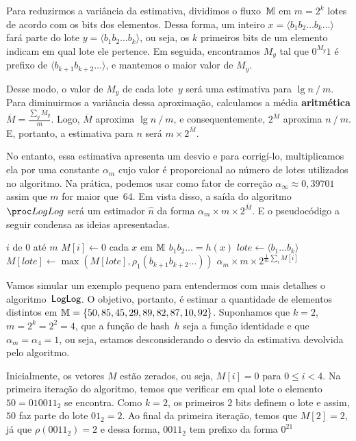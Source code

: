 Para reduzirmos a variância da estimativa, dividimos o fluxo~$\mathbb{M}$ em $m = 2^{k}$ lotes de acordo com os bits dos 
elementos. Dessa forma, um inteiro $x = \langle b_1 b_2 {\dots} b_k {\dots} \rangle$ fará parte do lote 
$y = \langle b_1 b_2 {\dots} b_k \rangle$, ou seja, os $k$ primeiros bits de um elemento indicam em qual lote ele 
pertence. Em seguida, encontramos $M_y$ tal que $0^{M_y}1$ é prefixo de $\langle b_{k+1} b_{k+2} {\dots} \rangle$, e 
mantemos o maior valor de $M_y$.

Desse modo, o valor de $M_y$ de cada lote~$y$ será uma estimativa para $\lg n \mathbin{/} m$. Para diminuirmos a 
variância dessa aproximação, calculamos a média \textbf{aritmética} $\overline{M} = \frac{\sum_y M_y}{m}$. Logo, 
$\overline{M}$ aproxima $\lg n \mathbin{/} m$, e consequentemente, $2^{\overline{M}}$ aproxima $n \mathbin{/} m$. E, 
portanto, a estimativa para $n$ será $m \times 2^{\overline{M}}$.

No entanto, essa estimativa apresenta um desvio e para corrigí-lo, multiplicamos ela por uma constante $\alpha_m$ cujo 
valor é proporcional ao número de lotes utilizados no algoritmo. Na prática, podemos usar como fator de correção 
$\alpha_\infty \approx 0{,}39701$ assim que $m$ for maior que~64. Em vista disso, a saída do algoritmo~$\LOG$ será um 
estimador $\hat{n}$ da forma $\alpha_m \times m \times 2^{\overline{M}}$. E o pseudocódigo a seguir condensa as ideias 
apresentadas.

\begin{codebox}
  \li \For $i$ de $0$ até $m$
        \Do
  \li   $M[i] \gets 0$
        \End
  \li \For cada $x$ em $\mathbb{M}$ 
        \Do
  \li   $b_1b_2{\dots} = h(x)$
  \li   $lote \gets \langle b_1 {\dots} b_k \rangle$
  \li   $M[lote] \gets \max(M[lote], \rho_1(b_{k+1}b_{k+2}{\dots}))$
        \End
  \li
  \Return $\alpha_m \times m \times 2^{\frac{1}{m}\sum_i{M[i]}}$   
  \End
\end{codebox}

Vamos simular um exemplo pequeno para entendermos com mais detalhes o algoritmo~$\textsf{LogLog}$. O objetivo, portanto, é 
estimar a quantidade de elementos distintos em $\mathbb{M} = \{ 50, 85, 45, 29, 89, 82, 87, 10, 92 \}$. Suponhamos que 
$k = 2$, $m = 2^{k} = 2^2 = 4$, que a função de hash~$h$ seja a função identidade e que $\alpha_m = \alpha_4 = 1$, 
ou seja, estamos desconsiderando o desvio da estimativa devolvida pelo algoritmo. 

Inicialmente, os vetores $M$ estão zerados, ou seja, $M[i] = 0$ para $0 \leq i < 4$. Na primeira iteração do algoritmo,
temos que verificar em qual lote o elemento $50 = 010011_2$ se encontra. Como $k = 2$, os primeiros $2$ bits definem o
lote e assim, $50$ faz parte do lote $01_2 = 2$. Ao final da primeira iteração, temos que $M[2] = 2$, já que 
$\rho(0011_2) = 2$ e dessa forma, $0011_2$ tem prefixo da forma $0^21$

